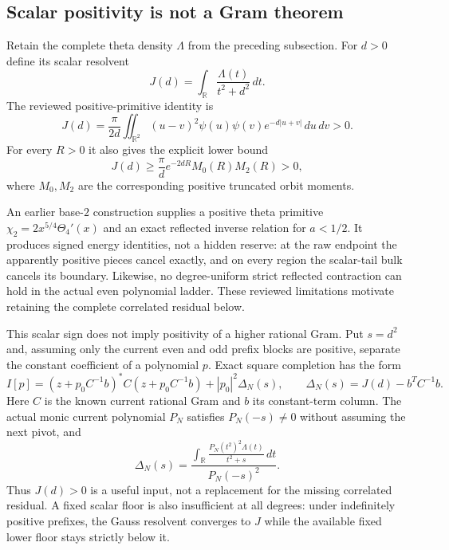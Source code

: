 \documentclass[11pt]{article}
\theoremstyle{definition}
\theoremstyle{remark}
\newcommand{\R}{\mathbb{R}}
\begin{document}
\subsection{Scalar positivity is not a Gram theorem}

Retain the complete theta density $\Lambda$ from the preceding subsection. For
$d>0$ define its scalar resolvent
\begin{equation}
 J(d)=\int_{\R}\frac{\Lambda(t)}{t^2+d^2}\,dt.
\end{equation}
The reviewed positive-primitive identity is
\begin{equation}
 J(d)=\frac{\pi}{2d}\iint_{\R^2}(u-v)^2\psi(u)\psi(v)
       e^{-d|u+v|}\,du\,dv>0.
 \label{eq:scalar-resolvent}
\end{equation}
For every $R>0$ it also gives the explicit lower bound
\begin{equation}
 J(d)\ge\frac{\pi}{d}e^{-2dR}M_0(R)M_2(R)>0,
 \label{eq:scalar-resolvent-lower}
\end{equation}
where $M_0,M_2$ are the corresponding positive truncated orbit moments.

An earlier base-$2$ construction supplies a positive theta primitive
$\chi_2=2x^{5/4}\Theta_4'(x)$ and an exact reflected inverse relation for
$a<1/2$. It produces signed energy identities, not a hidden reserve: at the
raw endpoint the apparently positive pieces cancel exactly, and on every
region the scalar-tail bulk cancels its boundary. Likewise, no
degree-uniform strict reflected contraction can hold in the actual even
polynomial ladder. These reviewed limitations motivate retaining the complete
correlated residual below.

This scalar sign does not imply positivity of a higher rational Gram. Put
$s=d^2$ and, assuming only the current even and odd prefix blocks are positive,
separate the constant coefficient of a polynomial $p$. Exact square completion
has the form
\begin{equation}
 I[p]=(z+p_0C^{-1}b)^*C(z+p_0C^{-1}b)+|p_0|^2\Delta_N(s),
 \qquad
 \Delta_N(s)=J(d)-b^TC^{-1}b.
 \label{eq:rational-square}
\end{equation}
Here $C$ is the known current rational Gram and $b$ its constant-term column.
The actual monic current polynomial $P_N$ satisfies $P_N(-s)\ne0$ without
assuming the next pivot, and
\begin{equation}
 \Delta_N(s)=
 \frac{\displaystyle\int_{\R}
       \frac{P_N(t^2)^2\Lambda(t)}{t^2+s}\,dt}
      {P_N(-s)^2}.
 \label{eq:delta-rational}
\end{equation}
Thus $J(d)>0$ is a useful input, not a replacement for the missing correlated
residual. A fixed scalar floor is also insufficient at all degrees: under
indefinitely positive prefixes, the Gauss resolvent converges to $J$ while the
available fixed lower floor stays strictly below it.
\end{document}
